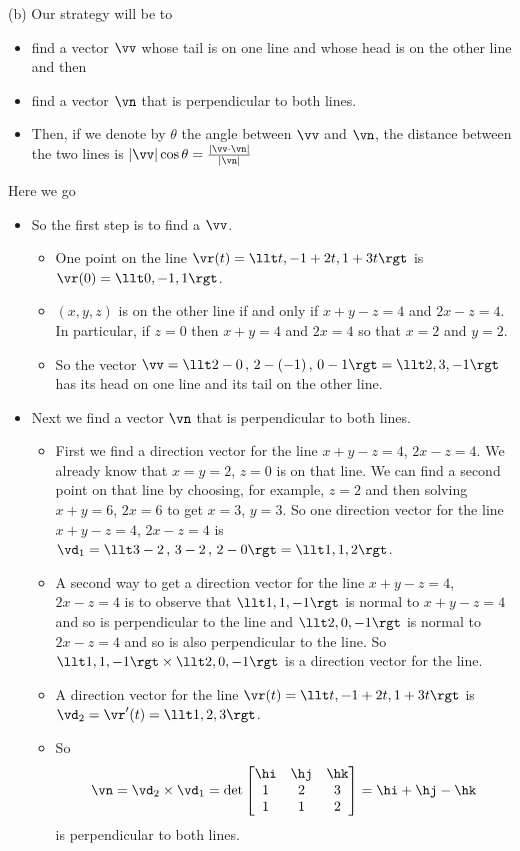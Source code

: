 \begin{solution}
(b) Our strategy will be to
\begin{itemize}
\item
  find a vector $\vv$ whose tail is on one line and whose head is on the
  other line and then
\item 
  find a vector $\vn$ that is perpendicular to both lines.
\item
  Then, if we denote by $\theta$ the angle between $\vv$ and $\vn$,
  the distance between the two lines is 
  $|\vv|\cos\theta = \frac{|\vv\cdot\vn|}{|\vn|}$
\end{itemize}
Here we go
\begin{itemize}
\item
So the first step is to find a $\vv$.
\begin{itemize}
\item 
One point on the line $\vr(t)=\llt t, -1+2t, 1+3t\rgt$ is 
$\vr(0)=\llt 0,-1,1\rgt$. 
\item
$(x,y,z)$ is on the other line if and only if $x+y-z=4$ and $2x-z=4$.
In particular, if $z=0$ then $x+y=4$ and $2x=4$ so that $x=2$ and $y=2$.
\item
So the vector $\vv=\llt 2-0\,,\,2-(-1)\,,\,0-1\rgt=\llt 2,3,-1\rgt$
has its head on one line and its tail on the other line.
\end{itemize}
\item
Next we find a vector $\vn$ that is perpendicular to both lines.
\begin{itemize} 
\item 
First we find a direction vector for the line $x+y-z=4$, $2x-z=4$.
We already know that $x=y=2$, $z=0$ is on that line. We can find a second point
on that line by choosing, for example, $z=2$ and then solving $x+y=6$, $2x=6$
to get $x=3$, $y=3$.  So one direction vector for the line $x+y-z=4$, $2x-z=4$
is $\vd_1=\llt3-2\,,\,3-2\,,\,2-0 \rgt = \llt 1,1,2\rgt$.
\item 
A second way to get a direction vector for the line $x+y-z=4$, $2x-z=4$
is to observe that $\llt 1,1,-1\rgt$ is normal to $x+y-z=4$ and so
is perpendicular to the line and $\llt 2,0,-1\rgt$ is normal to $2x-z=4$ 
and so is also perpendicular to the line. 
So $\llt 1,1,-1\rgt\times\llt 2,0,-1\rgt$ is a direction vector for the line.
\item
A direction vector for the line $\vr(t)=\llt t, -1+2t, 1+3t\rgt$ is $\vd_2=\vr'(t)=\llt 1,2,3\rgt$.
\item 
So 
\begin{equation*}
\vn=\vd_2\times\vd_1
=\det\left[\begin{matrix}
                     \hi & \hj & \hk \\
                     1   &  2  & 3 \\
                     1   &  1  & 2
                \end{matrix}\right]
= \hi + \hj -\hk 
\end{equation*}
is perpendicular to both lines.
\end{itemize}


\end{itemize}
\end{solution}
